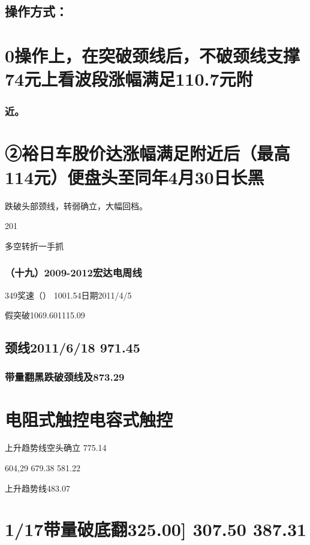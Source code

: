 \documentclass{article}
\begin{document}
\subsection{操作方式：}

\section{0操作上，在突破颈线后，不破颈线支撑74元上看波段涨幅满足110.7元附}

\subsubsection{近。}

\section{②裕日车股价达涨幅满足附近后（最高114元）便盘头至同年4月30日长黑}

跌破头部颈线，转弱确立，大幅回档。

201

\clearpage

多空转折一手抓

\subsubsection{（十九）2009-2012宏达电周线}

349奖速（） 1001.54日期2011/4/5

假突破1069.601115.09

\subsection{颈线2011/6/18 971.45}

\subsubsection{带量翻黑跌破颈线及873.29}

\section{电阻式触控电容式触控}

上升趋势线空头确立 775.14

604,29 679.38 581.22

上升趋势线483.07

\section{1/17带量破底翻325.00] 307.50 387.31}
\end{document}
